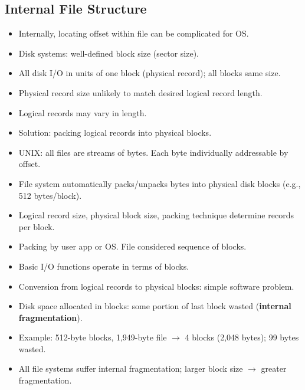 \subsection*{Internal File Structure}
\begin{itemize}
    \item Internally, locating offset within file can be complicated for OS.
    \item Disk systems: well-defined block size (sector size).
    \item All disk I/O in units of one block (physical record); all blocks same size.
    \item Physical record size unlikely to match desired logical record length.
    \item Logical records may vary in length.
    \item Solution: packing logical records into physical blocks.
    \item UNIX: all files are streams of bytes. Each byte individually addressable by offset.
    \item File system automatically packs/unpacks bytes into physical disk blocks (e.g., 512 bytes/block).
    \item Logical record size, physical block size, packing technique determine records per block.
    \item Packing by user app or OS. File considered sequence of blocks.
    \item Basic I/O functions operate in terms of blocks.
    \item Conversion from logical records to physical blocks: simple software problem.
    \item Disk space allocated in blocks: some portion of last block wasted (\textbf{internal fragmentation}).
    \item Example: 512-byte blocks, 1,949-byte file $\rightarrow$ 4 blocks (2,048 bytes); 99 bytes wasted.
    \item All file systems suffer internal fragmentation; larger block size $\rightarrow$ greater fragmentation.
\end{itemize}

